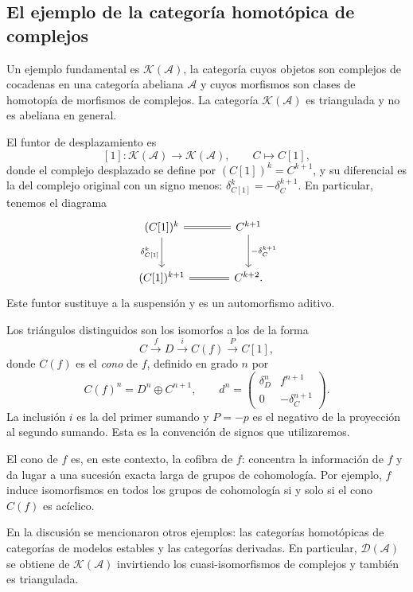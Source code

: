 \subsection{El ejemplo de la categoría homotópica de complejos}

Un ejemplo fundamental es $\mathcal K(\mathcal A)$, la categoría cuyos objetos son complejos de cocadenas en una categoría abeliana $\mathcal A$ y cuyos morfismos son clases de homotopía de morfismos de complejos. La categoría $\mathcal K(\mathcal A)$ es triangulada y no es abeliana en general.

El funtor de desplazamiento es
\[
[1]\colon\mathcal K(\mathcal A)\longrightarrow\mathcal K(\mathcal A),
\qquad
C\longmapsto C[1],
\]
donde el complejo desplazado se define por $(C[1])^k=C^{k+1}$, y su diferencial es la del complejo original con un signo menos: $\delta^k_{C[1]}=-\delta^{k+1}_C$. En particular, tenemos el diagrama
\[
\begin{tikzcd}[column sep=large,row sep=large]
(C[1])^k \arrow[r,equal] \arrow[d,"\delta_{C[1]}^k"'] & C^{k+1} \arrow[d,"-\delta_C^{k+1}"]\\
(C[1])^{k+1} \arrow[r,equal] & C^{k+2}.
\end{tikzcd}
\]
Este funtor sustituye a la suspensión y es un automorfismo aditivo.

Los triángulos distinguidos son los isomorfos a los de la forma
\[
C\xrightarrow{\ f\ }D\xrightarrow{\ i\ }C(f)\xrightarrow{\ P\ }C[1],
\]
donde $C(f)$ es el \emph{cono} de $f$, definido en grado $n$ por
\[
C(f)^n=D^n\oplus C^{n+1},
\qquad
d^n=\begin{pmatrix}\delta_D^n&f^{n+1}\\0&-\delta_C^{n+1}\end{pmatrix}.
\]
La inclusión $i$ es la del primer sumando y $P=-p$ es el negativo de la proyección al segundo sumando. Esta es la convención de signos que utilizaremos.

El cono de $f$ es, en este contexto, la cofibra de $f$: concentra la información de $f$ y da lugar a una sucesión exacta larga de grupos de cohomología. Por ejemplo, $f$ induce isomorfismos en todos los grupos de cohomología si y solo si el cono $C(f)$ es acíclico.

\begin{nota}
   En la discusión se mencionaron otros ejemplos: las categorías homotópicas de categorías de modelos estables y las categorías derivadas. En particular, $\mathcal D(\mathcal A)$ se obtiene de $\mathcal K(\mathcal A)$ invirtiendo los cuasi-isomorfismos de complejos y también es triangulada.
\end{nota}


